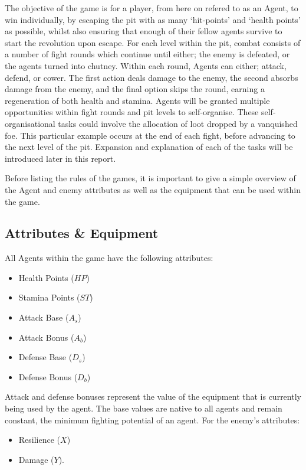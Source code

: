 The objective of the game is for a player, from here on refered to as an Agent, to win individually, by escaping the pit with as many `hit-points' and `health points' as possible, whilst also ensuring that enough of their fellow agents survive to start the revolution upon escape. 
For each level within the pit, combat consists of a number of fight rounds which continue until either; the enemy is defeated, or the agents turned into chutney. Within each round, Agents can either; attack, defend, or cower. The first action deals damage to the enemy, the second absorbs damage from the enemy, and the final option skips the round, earning a regeneration of both health and stamina.
Agents will be granted multiple opportunities within fight rounds and pit levels to self-organise. These self-organisational tasks could involve the allocation of loot dropped by a vanquished foe. This particular example occurs at the end of each fight, before advancing to the next level of the pit. Expansion and explanation of each of the tasks will be introduced later in this report. 

Before listing the rules of the games, it is important to give a simple overview of the Agent and enemy attributes as well as the equipment that can be used within the game.  

\subsection{Attributes \& Equipment}

All Agents within the game have the following attributes:

\begin{itemize} 
    \item Health Points ($HP$)
    \item Stamina Points ($ST$)
    \item Attack Base ($A_s$)
    \item Attack Bonus ($A_b$)
    \item Defense Base ($D_s$)
    \item Defense Bonus ($D_b$)
\end{itemize}

Attack and defense bonuses represent the value of the equipment that is currently being used by the agent. The base values are native to all agents and remain constant, the minimum fighting potential of an agent. For the enemy's attributes:

\begin{itemize}
    \item Resilience ($X$)
    \item Damage ($Y$).
\end{itemize}

